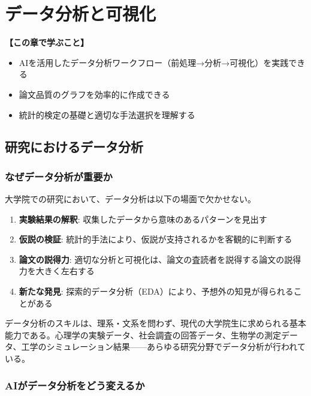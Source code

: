 \chapter{データ分析と可視化}
\label{chap7}

\begin{chapterbox}
\textbf{【この章で学ぶこと】}
\begin{itemize}
\item AIを活用したデータ分析ワークフロー（前処理→分析→可視化）を実践できる
\item 論文品質のグラフを効率的に作成できる
\item 統計的検定の基礎と適切な手法選択を理解する
\end{itemize}
\end{chapterbox}
\vspace{5mm}

\section{研究におけるデータ分析}

\subsection{なぜデータ分析が重要か}

大学院での研究において、データ分析は以下の場面で欠かせない。

\begin{enumerate}
\item \textbf{実験結果の解釈}: 収集したデータから意味のあるパターンを見出す
\item \textbf{仮説の検証}: 統計的手法により、仮説が支持されるかを客観的に判断する
\item \textbf{論文の説得力}: 適切な分析と可視化は、論文の査読者を説得する論文の説得力を大きく左右する
\item \textbf{新たな発見}: 探索的データ分析（EDA）により、予想外の知見が得られることがある
\end{enumerate}

データ分析のスキルは、理系・文系を問わず、現代の大学院生に求められる基本能力である。心理学の実験データ、社会調査の回答データ、生物学の測定データ、工学のシミュレーション結果——あらゆる研究分野でデータ分析が行われている。

\subsection{AIがデータ分析をどう変えるか}

